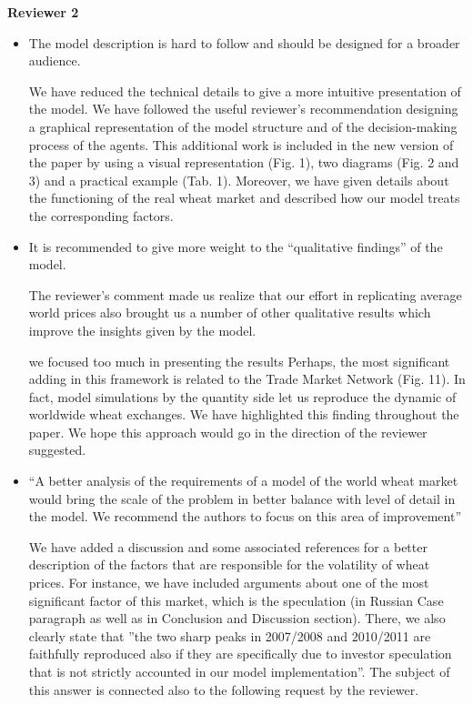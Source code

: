 \documentclass[a4paper,12pt]{article}
\begin{document}
\vskip1cm
\textbf{Reviewer 2}
\begin{itemize}
	\item The model description is hard to follow and should be designed for a broader audience.

		We have reduced the technical details to give a more intuitive presentation of the model. 
		We have followed the useful reviewer's recommendation designing a graphical representation of the model structure and of the decision-making process of the agents. This additional work is included in the new version of the paper by using a visual representation (Fig. 1), two diagrams (Fig. 2 and 3) and a practical example (Tab. 1). Moreover, we have given details about the functioning of the real wheat market and described how our model treats the corresponding factors. 
    
\item It is recommended to give more weight to the ``qualitative findings'' of the model.

The reviewer's comment made us realize that our effort in replicating average world prices also brought us a number of other qualitative results which improve the insights given by the model.

we focused too much in presenting the results 
    Perhaps, the most significant adding in this framework is related to the Trade Market Network (Fig. 11). In fact, model simulations by the quantity side let us reproduce the dynamic of worldwide wheat exchanges. We have highlighted this finding throughout the paper. We hope this approach would go in the direction of the reviewer suggested.
    
    \item ``A better analysis of the requirements of a model of the world wheat market would bring the scale of the problem in better balance with level of detail in the model. We recommend the authors to focus on this area of improvement'' 
    
    We have added a discussion and some associated references for a better description of the factors that are responsible for the volatility of wheat prices. For instance, we have included arguments about one of the most significant factor of this market, which is the speculation (in Russian Case paragraph as well as in Conclusion and Discussion section). There, we also clearly state that ''the two sharp peaks in 2007/2008 and 2010/2011 are faithfully reproduced also if they are specifically due to investor speculation that is not strictly accounted in our model implementation''. The subject of this answer is connected also to the following request by the reviewer.
    

\end{itemize}
\end{document}
